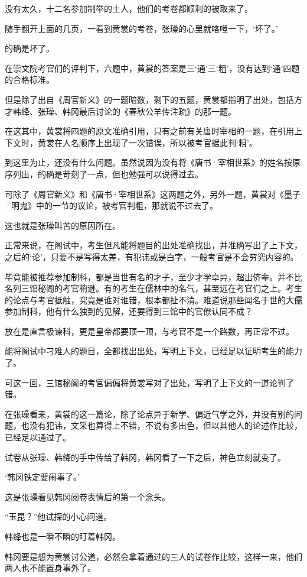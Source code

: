 没有太久，十二名参加制举的士人，他们的考卷都顺利的被取来了。

随手翻开上面的几页，一看到黄裳的考卷，张璪的心里就咯噔一下，‘坏了。’

的确是坏了。

在崇文院考官们的评判下，六题中，黄裳的答案是三‘通’三‘粗’，没有达到‘通’四题的合格标准。

但是除了出自《周官新义》的一题暗数，剩下的五题，黄裳都指明了出处，包括方才韩绛、张璪、韩冈最后讨论的《春秋公羊传注疏》的那一题。

在这其中，黄裳将四题的原文准确引用，只有之前有关唐时宰相的一题，在引用上下文时，黄裳在人名顺序上出现了一次错误，所以被考官据此判‘粗’。

到这里为止，还没有什么问题。虽然说因为没有将《唐书·宰相世系》的姓名按原序列出，的确是苛刻了一点，但也勉强可以说得过去。

可除了《周官新义》和《唐书·宰相世系》这两题之外，另外一题，黄裳对《墨子·明鬼》中的一节的议论，被考官判粗，那就说不过去了。

这也就是张璪叫苦的原因所在。

正常来说，在阁试中，考生但凡能将题目的出处准确找出，并准确写出了上下文，之后的‘论’，只要不是写得太差，有犯讳或是白字，一般考官是不会穷究内容的。

毕竟能被推荐参加制科，都是当世有名的才子，至少才学卓异，超出侪辈。并不比名列三馆秘阁的考官稍逊。有的考生在儒林中的名气，甚至远在考官们之上。考生的论点与考官抵触，究竟是谁对谁错，根本都扯不清。难道说那些闻名于世的大儒参加制科，他有什么独到的见解，还要得到三馆中的官僚认同不成？

放在是直言极谏科，更是皇帝都要顶一顶，与考官不是一个路数，再正常不过。

能将阁试中刁难人的题目，全都找出出处，写明上下文，已经足以证明考生的能力了。

可这一回，三馆秘阁的考官偏偏将黄裳写对了出处，写明了上下文的一道论判了错。

在张璪看来，黄裳的这一篇论，除了论点异于新学、偏近气学之外，并没有别的问题，也没有犯讳，文采也算得上不错，不说有多出色，但以其他人的论述作比较，已经足以通过了。

试卷从张璪、韩绛的手中传给了韩冈，韩冈看了一下之后，神色立刻就变了。

‘韩冈铁定要闹事了。’

这是张璪看见韩冈阅卷表情后的第一个念头。

“玉昆？”他试探的小心问道。

韩绛也是一瞬不瞬的盯着韩冈。

韩冈要是想为黄裳讨公道，必然会拿着通过的三人的试卷作比较，这样一来，他们两人也不能置身事外了。


